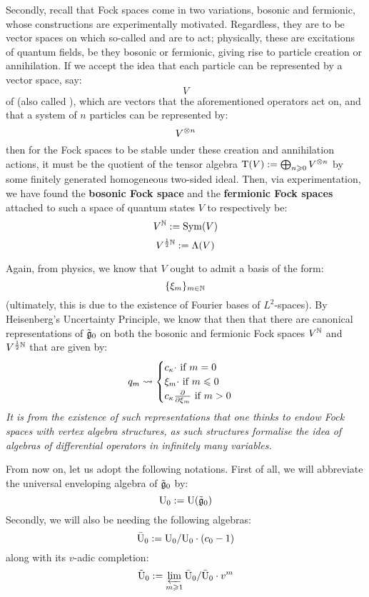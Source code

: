             Secondly, recall that Fock spaces come in two variations, bosonic and fermionic, whose constructions are experimentally motivated. Regardless, they are to be vector spaces on which so-called  and  are to act; physically, these are excitations of quantum fields, be they bosonic or fermionic, giving rise to particle creation or annihilation. If we accept the idea that each particle can be represented by a vector space, say:
                $$V$$
            of  (also called ), which are vectors that the aforementioned operators act on, and that a system of $n$ particles can be represented by:
                $$V^{\tensor n}$$
            then for the Fock spaces to be stable under these creation and annihilation actions, it must be the quotient of the tensor algebra $\rmT(V) := \bigoplus_{n \geq 0} V^{\tensor n}$ by some finitely generated homogeneous two-sided ideal. Then, via experimentation, we have found the \textbf{bosonic Fock space} and the \textbf{fermionic Fock spaces} attached to such a space of quantum states $V$ to respectively be:
                $$V^{\mathbb{N}} := \mathrm{Sym}(V)$$
                $$V^{\frac12 \mathbb{N}} := \Lambda(V)$$

            Again, from physics, we know that $V$ ought to admit a basis of the form:
                $$\{\xi_m\}_{m \in \mathbb{N}}$$
            (ultimately, this is due to the existence of Fourier bases of $L^2$-spaces). By Heisenberg's Uncertainty Principle, we know that then that there are canonical representations of $\tilde{\mathfrak{g}}_0$ on both the bosonic and fermionic Fock spaces $V^{\mathbb{N}}$ and $V^{\frac12 \mathbb{N}}$ that are given by:
                $$
                    q_m \leadsto
                    \begin{cases}
                        \text{$c_{\kappa} \cdot$ if $m = 0$}
                        \\
                        \text{$\xi_m \cdot$ if $m \leqslant 0$}
                        \\
                        \text{$c_{\kappa} \frac{\partial}{\partial \xi_m}$ if $m > 0$}
                    \end{cases}
                $$
            \textit{It is from the existence of such representations that one thinks to endow Fock spaces with vertex algebra structures, as such structures formalise the idea of algebras of differential operators in infinitely many variables.} 

            \begin{convention} \label{conv: completed_heisenberg_universal_enveloping_algebra}
                From now on, let us adopt the following notations. First of all, we will abbreviate the universal enveloping algebra of $\tilde{\mathfrak{g}}_0$ by:
                    $$\mathrm{U}_0 := \mathrm{U}(\tilde{\mathfrak{g}}_0)$$
                Secondly, we will also be needing the following algebras:
                    $$\bar{\mathrm{U}}_0 := \mathrm{U}_0/\mathrm{U}_0 \cdot (c_0 - 1)$$
                along with its $v$-adic completion:
                    $$\tilde{\mathrm{U}}_0 := \varprojlim_{m \geqslant 1} \bar{\mathrm{U}}_0/\bar{\mathrm{U}}_0 \cdot v^m$$
            \end{convention}

